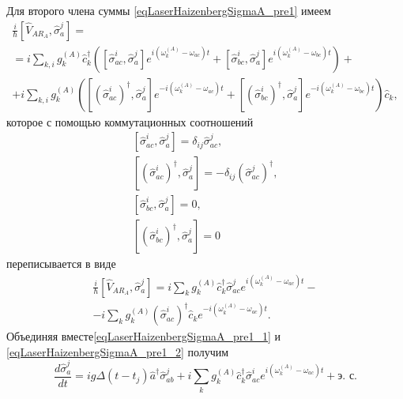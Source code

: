 Для второго члена суммы \eqref{eqLaserHaizenbergSigmaA_pre1} имеем
\begin{eqnarray}
\frac{i}{\hbar}
\left[\hat{V}_{AR_A}, \hat{\sigma}_a^j\right] = 
\nonumber \\
=
i
\sum_{k,i}
g_k^{(A)}
\hat{c}_k^{\dag}
 \left(
\left[\hat{\sigma}^{i}_{ac},\hat{\sigma}_a^j\right]  
e^{i\left(\omega_k^{(A)} - \omega_{ac}\right)t}
+ 
\left[\hat{\sigma}^{i}_{bc},\hat{\sigma}_a^j\right]  
e^{i\left(\omega_k^{(A)} - \omega_{bc}\right)t}
\right)
+
\nonumber \\
+
 i
\sum_{k,i}
g_k^{(A)}
 \left(
\left[\left(\hat{\sigma}^{i}_{ac}\right)^{\dag},\hat{\sigma}_a^j\right]  
e^{-i\left(\omega_k^{(A)} - \omega_{ac}\right)t}
+ 
\left[\left(\hat{\sigma}^{i}_{bc}\right)^{\dag},\hat{\sigma}_a^j\right]  
e^{-i\left(\omega_k^{(A)} - \omega_{bc}\right)t}
\right)\hat{c}_k,
\nonumber
\end{eqnarray}
которое с помощью коммутационных соотношений
\begin{eqnarray}
\left[\hat{\sigma}^{i}_{ac},\hat{\sigma}_a^j\right] = 
\delta_{ij}\hat{\sigma}^{j}_{ac},
\nonumber \\
\left[\left(\hat{\sigma}^{i}_{ac}\right)^{\dag},\hat{\sigma}_a^j\right] = 
- \delta_{ij}\left(\hat{\sigma}^{j}_{ac}\right)^{\dag},
\nonumber \\
\left[\hat{\sigma}^{i}_{bc},\hat{\sigma}_a^j\right] = 0,
\nonumber \\
\left[\left(\hat{\sigma}^{i}_{bc}\right)^{\dag},\hat{\sigma}_a^j\right] = 0
\label{eqLaserHaizenbergTaskKommutator}
\end{eqnarray}
переписывается в виде
\begin{eqnarray}
\frac{i}{\hbar}
\left[\hat{V}_{AR_A}, \hat{\sigma}_a^j\right] = 
i
\sum_{k}
g_k^{(A)}
\hat{c}_k^{\dag}\hat{\sigma}^{j}_{ac}  
e^{i\left(\omega_k^{(A)} - \omega_{ac}\right)t}
-
\nonumber \\
- i
\sum_{k}
g_k^{(A)}
\left(\hat{\sigma}^{i}_{ac}\right)^{\dag} 
\hat{c}_k
e^{-i\left(\omega_k^{(A)} - \omega_{ac}\right)t}.
\label{eqLaserHaizenbergSigmaA_pre1_2}
\end{eqnarray}
Объединяя вместе\eqref{eqLaserHaizenbergSigmaA_pre1_1} и 
\eqref{eqLaserHaizenbergSigmaA_pre1_2} получим 
\begin{equation}
\frac{d \hat{\sigma}_a^j}{d t} = 
i g 
\Delta\left(t - t_j\right) 
\hat{a}^{\dag}\hat{\sigma}^{j}_{ab}  +
i
\sum_{k}
g_k^{(A)}
\hat{c}_k^{\dag}\hat{\sigma}^{i}_{ac}  
e^{i\left(\omega_k^{(A)} - \omega_{ac}\right)t} + \mbox{э. с.}
\label{eqLaserHaizenbergSigmaA_pre2}
\end{equation}

